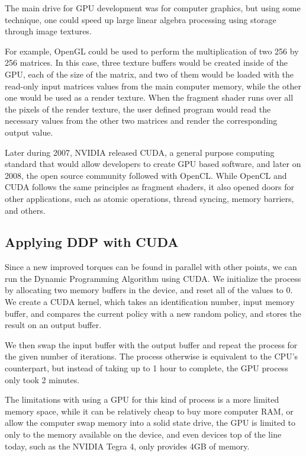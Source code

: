\documentclass{article}
\begin{document}
The main drive for GPU development was for computer graphics, but using some technique, one could speed up large linear algebra processing using storage through image textures. \cite{Goeddeke:2005:GBM}

For example, OpenGL could be used to perform the multiplication of two 256 by 256 matrices. In this case, three texture buffers would be created inside of the GPU, each of the size of the matrix, and two of them would be loaded with the read-only input matrices values from the main computer memory, while the other one would be used as a render texture. When the fragment shader runs over all the pixels of the render texture, the user defined program would read the necessary values from the other two matrices and render the corresponding output value. 

Later during 2007, NVIDIA released CUDA, a general purpose computing standard that would allow developers to create GPU based software, and later on 2008, the open source community followed with OpenCL. While OpenCL and CUDA follows the same principles as fragment shaders, it also opened doors for other applications, such as atomic operations, thread syncing, memory barriers, and others.

\subsection{Applying DDP with CUDA}
Since a new improved torques can be found in parallel with other points, we can run the Dynamic Programming Algorithm using CUDA.  We initialize the process by allocating two memory buffers in the device, and reset all of the values to 0.  We create a CUDA kernel, which takes an identification number, input memory buffer, and compares the current policy with a new random policy, and stores the result on an output buffer. 

We then swap the input buffer with the output buffer and repeat the process for the given number of iterations.  The process otherwise is equivalent to the CPU’s counterpart, but instead of taking up to 1 hour to complete, the GPU process only took 2 minutes. 

The limitations with using a GPU for this kind of process is a more limited memory space, while it can be relatively cheap to buy more computer RAM, or allow the computer swap memory into a solid state drive, the GPU is limited to only to the memory available on the device, and even devices top of the line today, such as the NVIDIA Tegra 4, only provides 4GB of memory. 
\end{document}
